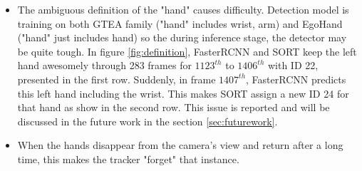 \begin{itemize}
	\item The ambiguous  definition of the "hand" causes difficulty. Detection model is training on both GTEA family ("hand" includes wrist, arm) and EgoHand ("hand" just includes hand) so the during inference stage, the detector may be quite tough. In figure \ref{fig:definition}, FasterRCNN and SORT keep the left hand awesomely through 283 frames for \(1123^{th}\) to \(1406^{th}\) with ID 22, presented in the first row. Suddenly, in frame \(1407^{th}\), FasterRCNN predicts this left hand including the wrist. This makes SORT assign a new ID 24 for that hand as show in the second row. This issue is reported and will be discussed in the future work in the section \ref{sec:futurework}.
	\item When the hands disappear from the camera’s view and return after a long time, this makes the tracker "forget" that instance.
\end{itemize}
